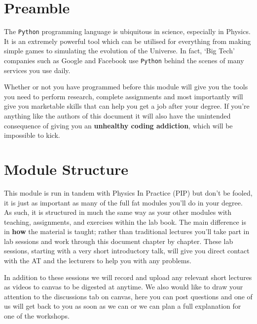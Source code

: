 \section*{Preamble}
The \texttt{Python} programming language is ubiquitous in science, especially in Physics. It is an extremely powerful tool which can be utilised for everything from making simple games to simulating the evolution of the Universe. In fact, `Big Tech' companies such as Google and Facebook use \texttt{Python} behind the scenes of many services you use daily. 

Whether or not you have programmed before this module will give you the tools you need to perform research, complete assignments and most importantly will give you marketable skills that can help you get a job after your degree. If you're anything like the authors of this document it will also have the unintended consequence of giving you an \textbf{unhealthy coding addiction}, which will be impossible to kick.

\section*{Module Structure}

This module is run in tandem with Physics In Practice (PIP) but don't be fooled, it is just as important as many of the full fat modules you'll do in your degree. As such, it is structured in much the same way as your other modules with teaching, assignments, and exercises within the lab book. The main difference is in \textbf{how} the material is taught; rather than traditional lectures you'll take part in lab sessions and work through this document chapter by chapter. These lab sessions, starting with a very short introductory talk, will give you direct contact with the AT and the lecturers to help you with any problems.

In addition to these sessions we will record and upload any relevant short lectures as videos to canvas to be digested at anytime. We also would like to draw your attention to the discussions tab on canvas, here you can post questions and one of us will get back to you as soon as we can or we can plan a full explanation for one of the workshops.

